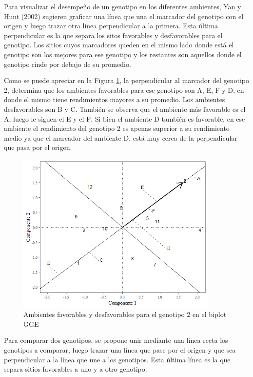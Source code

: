 Para visualizar el desempeño de un genotipo en los diferentes ambientes, Yan y Hunt (2002) sugieren graficar una línea que una el marcador del genotipo con el origen y luego trazar otra línea perpendicular a la primera. Esta última perpendicular es la que separa los sitos favorables y desfavorables para el genotipo. Los sitios cuyos marcadores queden en el mismo lado donde está el genotipo son los mejores para ese genotipo y los restantes son aquellos donde el genotipo rinde por debajo de su promedio.



Como se puede apreciar en la Figura \ref{fig:fig313}, la perpendicular al marcador del genotipo 2, determina que los ambientes favorables para ese genotipo son A, E, F y D, en donde el mismo tiene rendimientos mayores a su promedio. Los ambientes desfavorables son B y C.
También se observa que el ambiente más favorable es el A, luego le siguen el E y el F. Si bien el ambiente D también es favorable, en ese ambiente el rendimiento del genotipo 2 es apenas superior a su rendimiento medio ya que el marcador del ambiente D, está muy cerca de la perpendicular que pasa por el origen.

\begin{figure}[h]
	\begin{center}
		\includegraphics[width=10cm]{./Graficos/gen_GGE.png}
	\end{center}
	\caption{Ambientes favorables y desfavorables para el genotipo 2 en el biplot GGE}
	\label{fig:fig313}
\end{figure}


Para comparar dos genotipos, se propone unir mediante una línea recta los genotipos a comparar, luego trazar una línea que pase por el origen y que sea perpendicular a la línea que une a los genotipos. Esta última línea es la que separa sitios favorables a uno y a otro genotipo.


